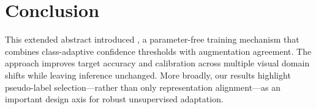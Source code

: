\section{Conclusion}

This extended abstract introduced \method, a parameter-free training mechanism
that combines class-adaptive confidence thresholds with augmentation agreement.
The approach improves target accuracy and calibration across multiple visual
domain shifts while leaving inference unchanged. More broadly, our results
highlight pseudo-label selection---rather than only representation
alignment---as an important design axis for robust unsupervised adaptation.

